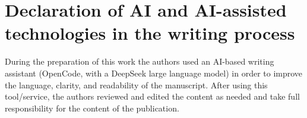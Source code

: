 
\section*{Declaration of AI and AI-assisted technologies in the writing process}

During the preparation of this work the authors used an AI-based writing
assistant (OpenCode, with a DeepSeek large language model) in order to improve
the language, clarity, and readability of the manuscript. After using this
tool/service, the authors reviewed and edited the content as needed and take
full responsibility for the content of the publication.
